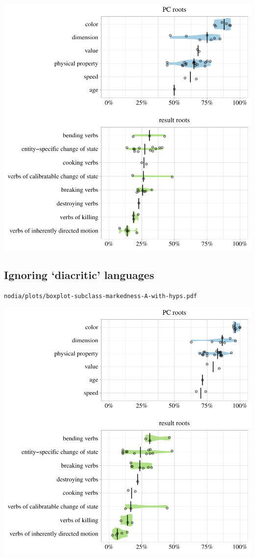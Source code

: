 \includegraphics[width=1.0\textwidth]{../nolow/plots/boxplot-subclass-markedness-A-with-hyps.pdf}

\subsection{Ignoring `diacritic' languages}

\texttt{nodia/plots/boxplot-subclass-markedness-A-with-hyps.pdf}

\includegraphics[width=1.0\textwidth]{../nodia/plots/boxplot-subclass-markedness-A-with-hyps.pdf}

